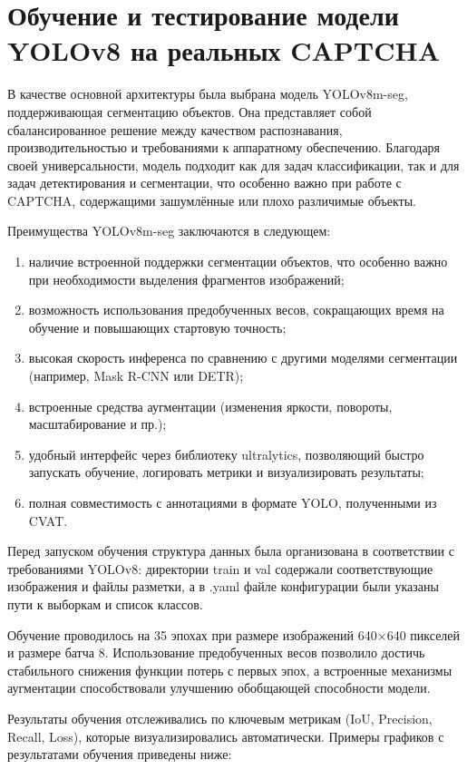 \chapter{Обучение и тестирование модели YOLOv8 на реальных CAPTCHA}

В качестве основной архитектуры была выбрана модель YOLOv8m-seg, поддерживающая сегментацию объектов. Она представляет собой сбалансированное решение между качеством распознавания, производительностью и требованиями к аппаратному обеспечению. Благодаря своей универсальности, модель подходит как для задач классификации, так и для задач детектирования и сегментации, что особенно важно при работе с CAPTCHA, содержащими зашумлённые или плохо различимые объекты.

Преимущества YOLOv8m-seg заключаются в следующем:

\begin{enumerate}
    \item наличие встроенной поддержки сегментации объектов, что особенно важно при необходимости выделения фрагментов изображений;
    \item возможность использования предобученных весов, сокращающих время на обучение и повышающих стартовую точность;
    \item высокая скорость инференса по сравнению с другими моделями сегментации (например, Mask R-CNN или DETR);
    \item встроенные средства аугментации (изменения яркости, повороты, масштабирование и пр.);
    \item удобный интерфейс через библиотеку ultralytics, позволяющий быстро запускать обучение, логировать метрики и визуализировать результаты;
    \item полная совместимость с аннотациями в формате YOLO, полученными из CVAT.
\end{enumerate}

Перед запуском обучения структура данных была организована в соответствии с требованиями YOLOv8: директории train и val содержали соответствующие изображения и файлы разметки, а в .yaml файле конфигурации были указаны пути к выборкам и список классов.

Обучение проводилось на 35 эпохах при размере изображений 640×640 пикселей и размере батча 8. Использование предобученных весов позволило достичь стабильного снижения функции потерь с первых эпох, а встроенные механизмы аугментации способствовали улучшению обобщающей способности модели.

Результаты обучения отслеживались по ключевым метрикам (IoU, Precision, Recall, Loss), которые визуализировались автоматически. Примеры графиков с результатами обучения приведены ниже:


